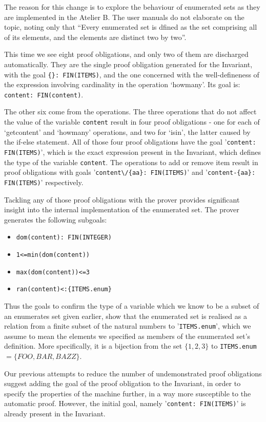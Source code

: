 \documentclass[12pt,journal,duplex]{IEEEtran}
\begin{document}
	The reason for this change is to explore the behaviour of enumerated sets as they are implemented in the Atelier B. The user manuals do not elaborate on the topic, noting only that ``Every enumerated set is dfined as the set comprising all of its elements, and the
	elements are distinct two by two''\cite{PO reference}.

	This time we see eight proof obligations, and only two of them are discharged automatically. They are the single proof obligation generated for the Invariant, with the goal \texttt{\{\}: FIN(ITEMS)}, and the one concerned with the well-defineness of the expression involving cardinality in the operation `howmany'. Its goal is: \texttt{content: FIN(content)}.

	The other six come from the operations. The three operations that do not affect the value of the variable \texttt{content} result in four proof obligations - one for each of `getcontent' and `howmany' operations, and two for `isin', the latter caused by the if-else statement. All of those four proof obligations have the goal '\texttt{content: FIN(ITEMS)}', which is the exact expression present in the Invariant, which defines the type of the variable \texttt{content}. The operations to add or remove item result in proof obligations with goals '\verb|content\/{aa}: FIN(ITEMS)|' and '\verb|content-{aa}: FIN(ITEMS)|' respectively.

	Tackling any of those proof obligations with the prover provides significant insight into the internal implementation of the enumerated set. The prover generates the following subgoals:

	\begin{itemize}
		\item \verb|dom(content): FIN(INTEGER)|
		\item \verb|1<=min(dom(content))|
		\item \verb|max(dom(content))<=3|
		\item \verb|ran(content)<:{ITEMS.enum}|
	\end{itemize}
	Thus the goals to confirm the type of a variable which we know to be a subset of an enumerates set given earlier, show that the enumerated set is realised as a relation from a finite subset of the natural numbers to '\texttt{ITEMS.enum}', which we assume to mean the elements we specified as members of the enumerated set's definition. More specifically, it is a bijection from the set $\{1,2,3\}$ to \texttt{ITEMS.enum} $= \{FOO, BAR, BAZZ\}$.

	Our previous attempts to reduce the number of undemonstrated proof obligations suggest adding the goal of the proof obligation to the Invariant, in order to specify the properties of the machine further, in a way more susceptible to the automatic proof. However, the initial goal, namely '\texttt{content: FIN(ITEMS)}' is already present in the Invariant.
\end{document}
